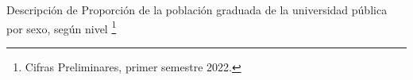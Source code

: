 Descripción de Proporción de la población graduada de la universidad pública por sexo, según nivel \footnote{Cifras Preliminares, primer semestre 2022.}